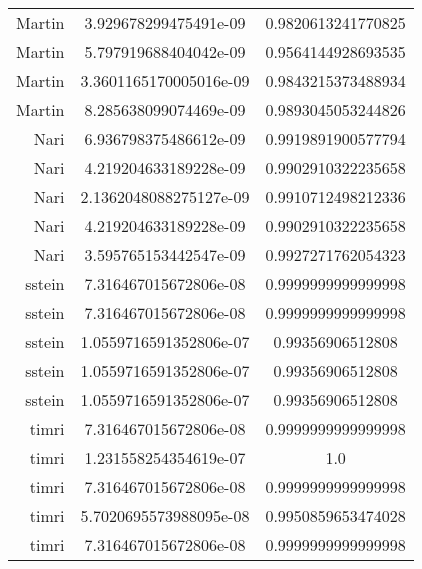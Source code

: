 \begin{tabular}{r c c}
    Martin & 3.929678299475491e-09 & 0.9820613241770825 \\
    Martin & 5.797919688404042e-09 & 0.9564144928693535 \\
    Martin & 3.3601165170005016e-09 & 0.9843215373488934 \\
    Martin & 8.285638099074469e-09 & 0.9893045053244826 \\
    Nari & 6.936798375486612e-09 & 0.9919891900577794 \\
    Nari & 4.219204633189228e-09 & 0.9902910322235658 \\
    Nari & 2.1362048088275127e-09 & 0.9910712498212336 \\
    Nari & 4.219204633189228e-09 & 0.9902910322235658 \\
    Nari & 3.595765153442547e-09 & 0.9927271762054323 \\
    sstein & 7.316467015672806e-08 & 0.9999999999999998 \\
    sstein & 7.316467015672806e-08 & 0.9999999999999998 \\
    sstein & 1.0559716591352806e-07 & 0.99356906512808 \\
    sstein & 1.0559716591352806e-07 & 0.99356906512808 \\
    sstein & 1.0559716591352806e-07 & 0.99356906512808 \\
    timri & 7.316467015672806e-08 & 0.9999999999999998 \\
    timri & 1.231558254354619e-07 & 1.0 \\
    timri & 7.316467015672806e-08 & 0.9999999999999998 \\
    timri & 5.7020695573988095e-08 & 0.9950859653474028 \\
    timri & 7.316467015672806e-08 & 0.9999999999999998 \\
\end{tabular}